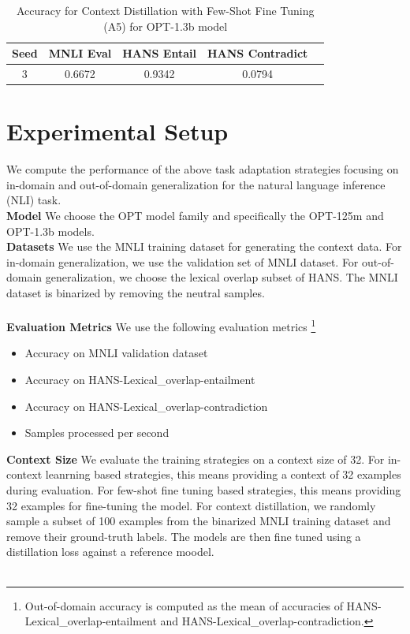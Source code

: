 \documentclass[10pt,twocolumn,letterpaper]{article}
\begin{document}
	\begin{table}[h!]
	\begin{center}
	\begin{tabular}{|c|c|c|c|c|}
	\hline
	\textbf{Seed} & \textbf{MNLI Eval} & \textbf{HANS Entail} & \textbf{HANS Contradict} \\
	\hline
	\hline
	3 & 0.6672 & 0.9342 & 0.0794 \\
	\hline
	\end{tabular}
	\end{center}
	\caption{Accuracy for Context Distillation with Few-Shot Fine Tuning (A5) for OPT-1.3b model}
	\end{table}

\section{Experimental Setup}
We compute the performance of the above task adaptation strategies focusing on in-domain and out-of-domain generalization for the natural language inference (NLI) task.\\
\textbf{Model} We choose the OPT model family and specifically the OPT-125m and OPT-1.3b models.\\
\textbf{Datasets} We use the MNLI training dataset for generating the context data. For in-domain generalization, we use the validation set of MNLI dataset. For out-of-domain generalization, we choose the lexical overlap subset of HANS. The MNLI dataset is binarized by removing the neutral samples.\\\\
\textbf{Evaluation Metrics} We use the following evaluation metrics
\footnote{Out-of-domain accuracy is computed as the mean of accuracies of HANS-Lexical\_overlap-entailment and HANS-Lexical\_overlap-contradiction.}
\begin{itemize}
    \item Accuracy on MNLI validation dataset
    \item Accuracy on HANS-Lexical\_overlap-entailment
    \item Accuracy on HANS-Lexical\_overlap-contradiction
    \item Samples processed per second
\end{itemize}
\textbf{Context Size} We evaluate the training strategies on a context size of 32. For in-context leanrning based strategies, this means providing a context of 32 examples during evaluation. For few-shot fine tuning based strategies, this means providing 32 examples for fine-tuning the model. For context distillation, we randomly sample a subset of 100 examples from the binarized MNLI training dataset and remove their ground-truth labels. The models are then fine tuned using a distillation loss against a reference moodel.\\\\
\end{document}
